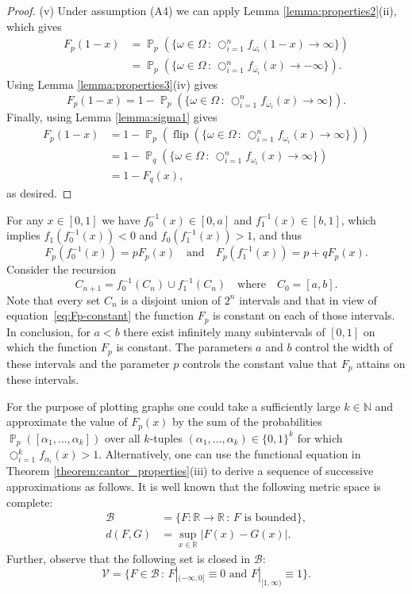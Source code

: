 \documentclass[a4paper,12pt]{article}
\DeclareMathOperator{\prob}{\mathbb{P}}
\DeclareMathOperator{\bigcomp}{\bigcirc}
\DeclareMathOperator{\rec}{flip}
\begin{document}
\begin{proof}
(v) Under assumption (A4) we can apply Lemma \ref{lemma:properties2}(ii), which gives
\[
\begin{split}
F_{p}(1-x)
	& = \prob_p(\{ \omega \in \Omega \,:\, \bigcomp_{i=1}^n f_{\omega_i}(1-x) \to \infty \}) \\
	& = \prob_p(\{ \omega \in \Omega \,:\, \bigcomp_{i=1}^n f_{\overline{\omega}_i}(x) \to -\infty \}).
\end{split}
\]
Using Lemma \ref{lemma:properties3}(iv) gives
\[
F_{p}(1-x)
	= 1-\prob_p(\{ \omega \in \Omega \,:\, \bigcomp_{i=1}^n f_{\overline{\omega}_i}(x) \to \infty \}).
\]
Finally, using Lemma \ref{lemma:sigma1} gives
\[
\begin{split}
F_{p}(1-x)
	& = 1-\prob_p(\rec(\{ \omega \in \Omega \,:\, \bigcomp_{i=1}^n f_{\omega_i}(x) \to \infty \})) \\
	& = 1-\prob_q(\{ \omega \in \Omega \,:\, \bigcomp_{i=1}^n f_{\omega_i}(x) \to \infty \}) \\
	& = 1-F_{q}(x),
\end{split}
\]
as desired.
\end{proof}

For any $x \in [0,1]$ we have $f_0^{-1}(x) \in [0,a]$ and $f_1^{-1}(x) \in [b,1]$, which implies $f_1(f_0^{-1}(x)) < 0$ and $f_0(f_1^{-1}(x)) > 1$, and thus
\begin{equation}
\label{eq:Fp-constant}
F_{p}(f_0^{-1}(x)) = pF_{p}(x)
\quad\text{and}\quad
F_{p}(f_1^{-1}(x)) = p + qF_{p}(x).
\end{equation}
Consider the recursion
\begin{equation}
\label{eq:Cn-recursion}
C_{n+1} = f_0^{-1}(C_n) \cup f_1^{-1}(C_n)
\quad\text{where}\quad
C_0 = [a,b].
\end{equation}
Note that every set $C_n$ is a disjoint union of $2^n$ intervals and that in view of equation~\eqref{eq:Fp-constant} the function $F_p$ is constant on each of those intervals. In conclusion, for $a<b$ there exist infinitely many subintervals of $[0,1]$ on which the function $F_{p}$ is constant. The parameters $a$ and $b$ control the width of these intervals and the parameter $p$ controls the constant value that $F_p$ attains on these intervals.

For the purpose of plotting graphs one could take a sufficiently large $k \in \mathbb{N}$ and approximate the value of $F_p(x)$ by the sum of the probabilities $\prob_p ([\alpha_1,\dots,\alpha_k])$ over all $k$-tuples $(\alpha_1,\dots,\alpha_k) \in \{0,1\}^k$ for which $\bigcomp_{i=1}^k f_{\alpha_i}(x) > 1$. Alternatively, one can use the functional equation in Theorem \ref{theorem:cantor_properties}(iii) to derive a sequence of successive approximations as follows. It is well known that the following metric space is complete:
\[
\begin{split}
\mathcal{B} & = \{F : \mathbb{R} \to \mathbb{R} \,:\, F \text{ is bounded}\}, \\
d(F,G) & = \sup_{x \in \mathbb{R}} |F(x) - G(x)|.
\end{split}
\]
Further, observe that the following set is closed in $\mathcal{B}$:
\[
\mathcal{V} = \{ F \in \mathcal{B} \,:\, F|_{(-\infty,0]} \equiv 0 \text{ and } F|_{[1,\infty)} \equiv 1\}.
\]
\end{document}
